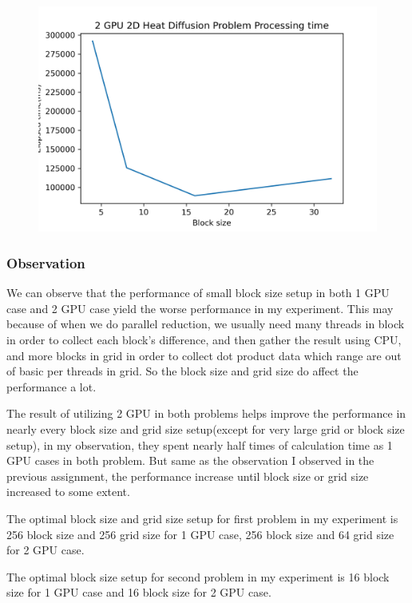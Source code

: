 \documentclass{article}
\begin{document}
	\begin{figure}[hb!]
		\centering
		\includegraphics[width=\linewidth]{notebook/2gpu_heat_diffusion_processing_time}
	\end{figure}

	\subsubsection{Observation}
	We can observe that the performance of small block size setup in both 1 GPU case and 2 GPU case yield the worse performance in my experiment. This may because of when we do parallel reduction, we usually need many threads in block in order to collect each block's difference, and then gather the result using CPU, and more blocks in grid in order to collect dot product data which range are out of basic per threads in grid. So the block size and grid size do affect the performance a lot.
	
	The result of utilizing 2 GPU in both problems helps improve the performance in nearly every block size and grid size setup(except for very large grid or block size setup), in my observation, they spent nearly half times of calculation time as 1 GPU cases in both problem. But same as the observation I observed in the previous assignment, the performance increase until block size or grid size increased to some extent. 
	
	The optimal block size and grid size setup for first problem in my experiment is 256 block size and 256 grid size for 1 GPU case, 256 block size and 64 grid size for 2 GPU case.
	
	The optimal block size setup for second problem in my experiment is 16 block size for 1 GPU case and 16 block size for 2 GPU case.
	
\end{document}
